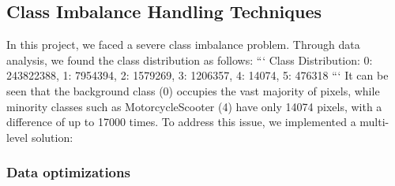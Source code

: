 \documentclass[conference]{IEEEtran}
\begin{document}

\subsection{Class Imbalance Handling Techniques}



In this project, we faced a severe class imbalance problem. Through data analysis, we found the class distribution as follows:
```
Class Distribution: {0: 243822388, 1: 7954394, 2: 1579269, 3: 1206357, 4: 14074, 5: 476318}
```
It can be seen that the background class (0) occupies the vast majority of pixels, while minority classes such as MotorcycleScooter (4) have only 14074 pixels, with a difference of up to 17000 times. To address this issue, we implemented a multi-level solution:


\subsubsection{Data optimizations}


            
\end{document}
